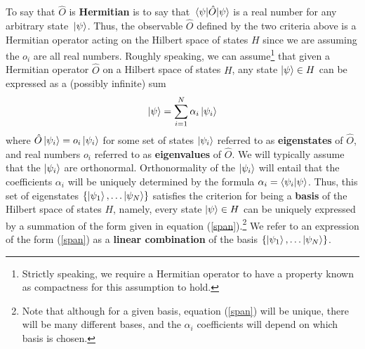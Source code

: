 To say that $\hat{O}$ is \textbf{Hermitian} is to say that $\ev*{\hat{O}}{\psi}$ is a real number for any arbitrary state $\ket*{\psi}$. Thus, the observable $\hat{O}$ defined by the two criteria above is a Hermitian operator acting on the Hilbert space of states $H$ since we are assuming the $o_i$ are all real numbers. Roughly speaking, we can assume\footnote{Strictly speaking, we require a Hermitian operator to have a property known as compactness for this assumption to hold.}  that given a Hermitian operator $\hat{O}$ on a Hilbert space of states $H$, any state $\ket{\psi}\in H$ can be expressed as a (possibly infinite) sum 
\begin{equation}\label{span}
\ket{\psi}=\sum_{i=1}^N\alpha_i\ket{\psi_i}
\end{equation}
where $\hat{O}\ket{\psi_i}=o_i\ket{\psi_i}$ for some set of states $\ket{\psi_i}$ referred to as \textbf{eigenstates}\label{eigendef} of $\hat{O}$, and real numbers $o_i$ referred to as \textbf{eigenvalues} of $\hat{O}$. We will typically assume that the $\ket{\psi_i}$ are orthonormal. Orthonormality of the $\ket{\psi_i}$ will entail that the coefficients $\alpha_i$ will be uniquely determined by the formula $\alpha_i=\ip{\psi_i}{\psi}$. Thus, this set of eigenstates $\{\ket{\psi_1},\ldots\ket{\psi_N}\}$ satisfies the criterion for being a \textbf{basis} of the Hilbert space of states $H$, namely, every state $\ket{\psi}\in H$ can be uniquely expressed by a summation of the form given in equation (\ref{span}).\footnote{Note that although for a given basis, equation (\ref{span}) will be unique, there will be many different bases, and the $\alpha_i$ coefficients will depend on which basis is chosen.} We refer to an expression of the form (\ref{span}) as a \textbf{linear combination} of the basis $\{\ket{\psi_1},\ldots\ket{\psi_N}\}$. 
